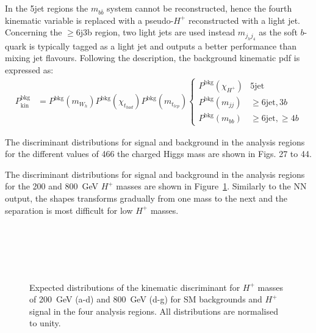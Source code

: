 In the 5jet regions the $m_{b\bar{b}}$ system cannot be reconstructed, hence the fourth kinematic variable is replaced with a pseudo-$H^+$ reconstructed with a light jet. Concerning the $\geq$6j3b region, two light jets are used instead $m_{j_hj_4}$ as the soft $b$-quark is typically tagged as a light jet and outputs a better performance than mixing jet flavours. Following the description, the background kinematic pdf is expressed as:
\begin{align}
    P_{\text{kin}}^{\text{bkg}}&=P^{\text{bkg}}(m_{W_h})P^{\text{bkg}}(\chi_{t_{had}})P^{\text{bkg}}(m_{t_{lep}})\begin{cases}P^{\text{bkg}}(\chi_{H^+}) & 5\text{jet} \\ P^{\text{bkg}}(m_{jj})&\geq6\text{jet},3b\\P^{\text{bkg}}(m_{bb})& \geq6\text{jet},\geq4b\end{cases}
\end{align}

The discriminant distributions for signal and background in the analysis regions for the different values of
466 the charged Higgs mass are shown in Figs. 27 to 44.

The discriminant distributions for signal and background in the analysis regions for the 200 and 800~GeV $H^+$ masses are shown in Figure~\ref{Hplustb:Discriminantshapes}. Similarly to the NN output, the shapes transforms gradually from one mass to the next and the separation is most difficult for low $H^+$ masses.

\begin{figure}[htb]
    \RawFloats
    \centering
     \\
     \\
     \\
     \\
    \caption{Expected distributions of the kinematic discriminant for $H^+$ masses of 200~GeV (a-d)
    and 800~GeV (d-g) for SM backgrounds and $H^+$ signal in the four analysis regions.
    All distributions are normalised to unity.
    }
    \label{Hplustb:Discriminantshapes}
\end{figure}
\clearpage

